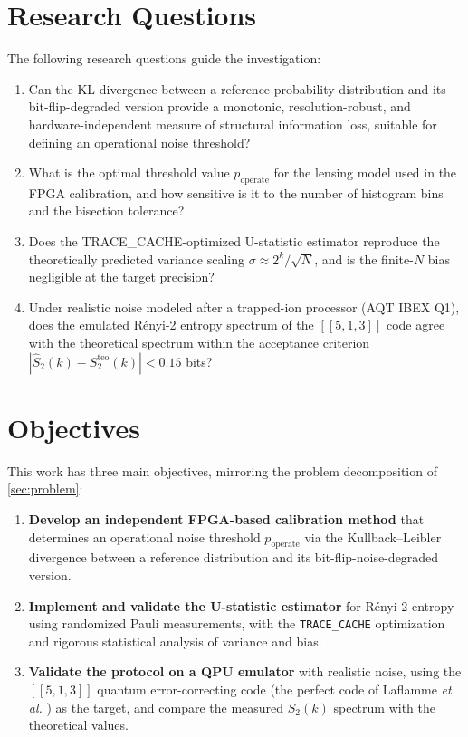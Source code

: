 \documentclass[12pt,a4paper,oneside]{book}
\theoremstyle{plain}
\theoremstyle{definition}
\theoremstyle{remark}
\begin{document}
\section{Research Questions}
\label{sec:questions}

The following research questions guide the investigation:

\begin{enumerate}[label=\textbf{RQ\arabic*:}, itemsep=3pt]
    \item Can the KL divergence between a reference probability distribution and its bit-flip-degraded version provide a monotonic, resolution-robust, and hardware-independent measure of structural information loss, suitable for defining an operational noise threshold?
    \item What is the optimal threshold value $p_{\text{operate}}$ for the lensing model used in the FPGA calibration, and how sensitive is it to the number of histogram bins and the bisection tolerance?
    \item Does the TRACE\_CACHE-optimized U-statistic estimator reproduce the theoretically predicted variance scaling $\sigma \approx 2^k / \sqrt{N}$, and is the finite-$N$ bias negligible at the target precision?
    \item Under realistic noise modeled after a trapped-ion processor (AQT IBEX Q1), does the emulated R\'enyi-2 entropy spectrum of the $[[5,1,3]]$ code agree with the theoretical spectrum within the acceptance criterion $| \widehat{S}_2(k) - S_2^{\text{teo}}(k) | < 0.15$ bits?
\end{enumerate}

\section{Objectives}
\label{sec:objectives}

This work has three main objectives, mirroring the problem decomposition of \cref{sec:problem}:

\begin{enumerate}
    \item \textbf{Develop an independent FPGA-based calibration method} that determines an operational noise threshold $p_{\text{operate}}$ via the Kullback--Leibler divergence between a reference distribution and its bit-flip-noise-degraded version.
    \item \textbf{Implement and validate the U-statistic estimator} for R\'enyi-2 entropy using randomized Pauli measurements, with the \texttt{TRACE\_CACHE} optimization and rigorous statistical analysis of variance and bias.
    \item \textbf{Validate the protocol on a QPU emulator} with realistic noise, using the $[[5,1,3]]$ quantum error-correcting code (the perfect code of Laflamme \textit{et al.} \cite{laflamme1996perfect}) as the target, and compare the measured $S_2(k)$ spectrum with the theoretical values.
\end{enumerate}
\end{document}
